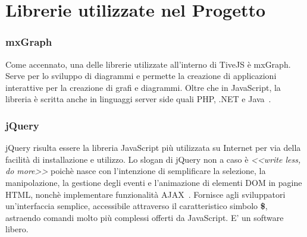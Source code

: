         \section{Librerie utilizzate nel Progetto}
            \subsubsection{mxGraph}
                Come accennato, una delle librerie utilizzate all'interno di TiveJS è mxGraph. Serve per lo sviluppo di diagrammi e permette la creazione di applicazioni interattive per la creazione di grafi e diagrammi. Oltre che in JavaScript, la libreria è scritta anche in linguaggi server side quali PHP, .NET e Java~\cite{mxgraph}.
            \subsubsection{jQuery}
                jQuery risulta essere la libreria JavaScript più utilizzata su Internet per via della facilità di installazione e utilizzo.
                \newline
                Lo slogan di jQuery non a caso è \textit{<<write less, do more>>} poichè nasce con l'intenzione di semplificare la selezione, la manipolazione, la gestione degli eventi e l'animazione di elementi DOM in pagine HTML, nonchè implementare funzionalità AJAX~\cite{jquery}.
                \newline
                Fornisce agli sviluppatori un'interfaccia semplice, accessibile attraverso il caratteristico simbolo \textbf{\$}, astraendo comandi molto più complessi offerti da JavaScript. E' un software libero.